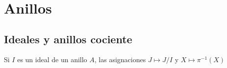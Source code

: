\chapter{Anillos}
\section{Ideales y anillos cociente}

\begin{teo} Si $I$ es un ideal de un anillo $A$, las asignaciones $J\mapsto J/I$ y $X\mapsto\pi^{-1}(X)$
\end{teo}